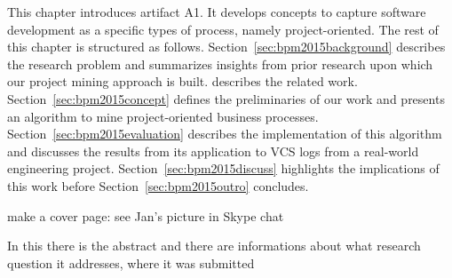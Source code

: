 This chapter introduces artifact A1. It develops concepts to capture software development as a specific types of process, namely project-oriented. 
The rest of this chapter is structured as follows. Section~\ref{sec:bpm2015background} describes the research problem and summarizes insights from prior research upon which our project mining approach is built.  describes the related work. Section~\ref{sec:bpm2015concept} defines the preliminaries of our work and presents an algorithm to mine project-oriented business processes. Section~\ref{sec:bpm2015evaluation} describes the implementation of this algorithm and discusses the results from its application to VCS logs from a real-world engineering project. Section~\ref{sec:bpm2015discuss} highlights the implications of this work before Section~\ref{sec:bpm2015outro} concludes. 




make a cover page: see Jan's picture in Skype chat

In this there is the abstract and there are informations about what research question it addresses, where it was submitted


